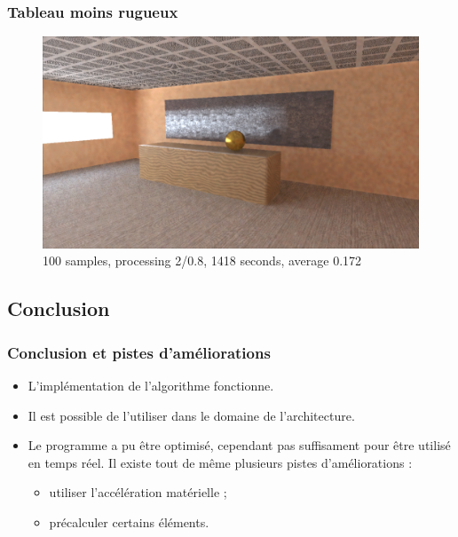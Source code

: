 \documentclass[handout]{beamer}
\begin{document}
\begin{frame}
    \frametitle{Tableau moins rugueux}

    \begin{figure}
        \includegraphics[scale=0.25]{tableau.png}
        \caption{100 samples, processing 2/0.8, 1418 seconds, average 0.172}
    \end{figure}

\end{frame}

\subsection{Conclusion}

\begin{frame}
    \frametitle{Conclusion et pistes d'améliorations}

    \begin{itemize}
        \item L'implémentation de l'algorithme fonctionne.
        \item Il est possible de l'utiliser dans le domaine de l'architecture.
        \item
            Le programme a pu être optimisé, cependant pas suffisament pour être utilisé en temps réel.
            Il existe tout de même plusieurs pistes d'améliorations :
            \begin{itemize}
                \item utiliser l'accélération matérielle ;
                \item précalculer certains éléments.
            \end{itemize}
    \end{itemize}

\end{frame}
\end{document}
